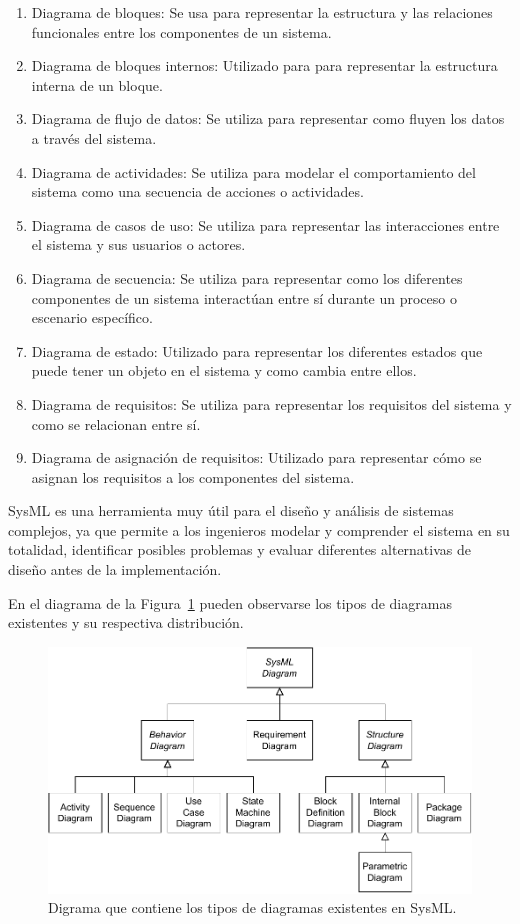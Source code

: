 \begin{enumerate}

\item Diagrama de bloques: Se usa para representar la estructura y las relaciones funcionales entre los componentes de un sistema.
\item Diagrama de bloques internos: Utilizado para para representar la estructura interna de un bloque.
\item Diagrama de flujo de datos: Se utiliza para representar como fluyen los datos a través del sistema.
\item Diagrama de actividades: Se utiliza para modelar el comportamiento del sistema como una secuencia de acciones o actividades.
\item Diagrama de casos de uso: Se utiliza para representar las interacciones entre el sistema y sus usuarios o actores.
\item Diagrama de secuencia: Se utiliza para representar como los diferentes componentes de un sistema interactúan entre sí durante un proceso o escenario específico.
\item Diagrama de estado: Utilizado para representar los diferentes estados que puede tener un objeto en el sistema y como cambia entre ellos.
\item Diagrama de requisitos: Se utiliza para representar los requisitos del sistema y como se relacionan entre sí.
\item Diagrama de asignación de requisitos: Utilizado para representar cómo se asignan los requisitos a los componentes del sistema.
\end{enumerate}
SysML es una herramienta muy útil para el diseño y análisis de sistemas complejos, ya que permite a los ingenieros modelar y comprender el sistema en su totalidad, identificar posibles problemas y evaluar diferentes alternativas de diseño antes de la implementación.

En el diagrama de la Figura~\ref{fig:SYSML} pueden observarse los tipos de diagramas existentes y su respectiva distribución.

\begin{figure}[ht]
\centering
\includegraphics{images/SysMLDiagram.pdf}
\caption[Tipos de diagramas SysML]{Digrama que contiene los tipos de diagramas existentes en SysML.}%
\label{fig:SYSML}
\end{figure}

